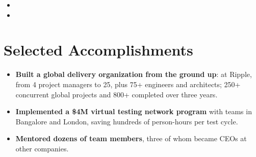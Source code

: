 \documentclass[11pt,letterpaper,sans]{moderncv}
\begin{document}
\begin{itemize}
\vspace{3pt}

\item{}

\vspace{3pt}

\item{}

\end{itemize}


\section{Selected Accomplishments}
\vspace{1pt}
\begin{itemize}
\item {\textbf{Built a global delivery organization from the ground up}: at Ripple, from 4 project managers to 25, plus 75+ engineers and architects; 250+ concurrent global projects and 800+ completed over three years.}
\item {\textbf{Implemented a \$4M virtual testing network program} with teams in Bangalore and London, saving hundreds of person-hours per test cycle.}
\item {\textbf{Mentored dozens of team members}, three of whom became CEOs at other companies.}
\end{itemize}

\end{document}
